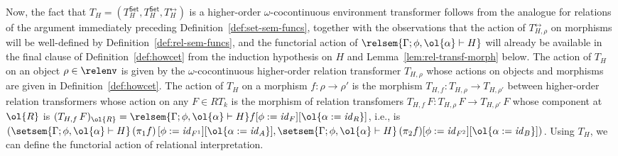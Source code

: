 \documentclass{lmcs}
\theoremstyle{plain}\newtheorem{satz}[thm]{Satz}
\newcommand{\set}{\mathsf{Set}}
\renewcommand{\id}{\mathit{id}}
\begin{document}
Now, the fact that $T_H = (T^\set_H, T^\set_H, T^\rel_H) $ is a
higher-order $\omega$-cocontinuous environment transformer follows
from the analogue for relations of the argument immediately preceding
Definition~\ref{def:set-sem-funcs}, together with the observations
that the action of $T^\rel_{H,\rho}$ on morphisms will be well-defined
by Definition~\ref{def:rel-sem-funcs}, and the functorial action of
$\relsem{\Gamma; \phi,\ol{\alpha} \vdash H}$ will already be available
in the final clause of Definition~\ref{def:howcet} from the induction
hypothesis on $H$ and Lemma~\ref{lem:rel-transf-morph} below. The
action of $T_H$ on an object $\rho \in \relenv$ is given by the
$\omega$-cocontinuous higher-order relation transformer $T_{H,\rho}$
whose actions on objects and morphisms are given in
Definition~\ref{def:howcet}. The action of $T_H$ on a morphism $f :
\rho \to \rho'$ is the morphism $T_{H,f} : T_{H,\rho} \to T_{H,\rho'}$
between higher-order relation transformers whose action on any $F \in
RT_k$ is the morphism of relation transfomers $T_{H,f}\, F :
T_{H,\rho}\, F \to T_{H,\rho'}\, F$ whose component at $\ol{R}$ is
$(T_{H,f}\, F)_{\ol{R}} = \relsem{\Gamma; \phi,\ol{\alpha} \vdash
  H}f[\phi := \id_F][\ol{\alpha := \id_R}]$, i.e., is
$(\setsem{\Gamma; \phi,\ol{\alpha} \vdash H}\,(\pi_1 f)\,[\phi :=
  \id_{F^1}][\ol{\alpha := \id_A}], \setsem{\Gamma; \phi,\ol{\alpha}
  \vdash H}\,(\pi_2 f)[\phi := \id_{F^2}][\ol{\alpha := \id_B}])$.
Using $T_H$, we can define the functorial action of relational
interpretation.
\end{document}

